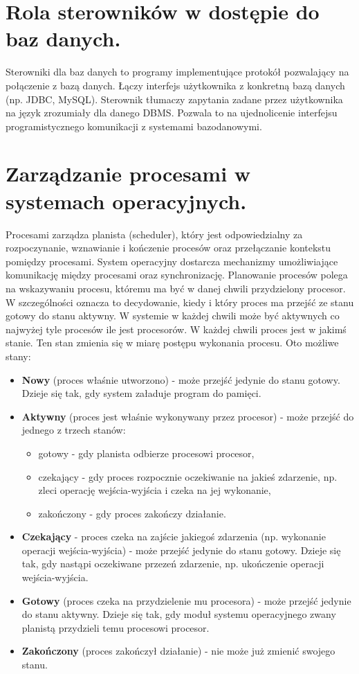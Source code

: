 \documentclass[12pt,a4paper]{article}
\begin{document}
	\section{Rola sterowników w dostępie do baz danych.}
	Sterowniki dla baz danych to programy implementujące protokół pozwalający na połączenie z bazą danych. Łączy interfejs użytkownika z konkretną bazą danych (np. JDBC, MySQL). Sterownik tłumaczy zapytania zadane przez użytkownika na język zrozumiały dla danego DBMS. Pozwala to na ujednolicenie interfejsu programistycznego komunikacji z systemami bazodanowymi.

	\section{Zarządzanie procesami w systemach operacyjnych.}
	Procesami zarządza planista (scheduler), który jest odpowiedzialny za rozpoczynanie, wznawianie i kończenie procesów oraz przełączanie kontekstu pomiędzy procesami. System operacyjny dostarcza mechanizmy umożliwiające komunikację między procesami oraz synchronizację. Planowanie procesów polega na wskazywaniu procesu, któremu ma być w danej chwili przydzielony procesor. W szczególności oznacza to decydowanie, kiedy i który proces ma przejść ze stanu gotowy do stanu aktywny. W systemie w każdej chwili może być aktywnych co najwyżej tyle procesów ile jest procesorów. W każdej chwili proces jest w jakimś stanie. Ten stan zmienia się w miarę postępu wykonania procesu. Oto możliwe stany:
	
	\begin{itemize}
		\item \textbf{Nowy} (proces właśnie utworzono) - może przejść jedynie do stanu gotowy. Dzieje się tak, gdy system załaduje program do pamięci.
		\item \textbf{Aktywny} (proces jest właśnie wykonywany przez procesor) - może przejść do jednego z trzech stanów:
		\begin{itemize}
			\item gotowy - gdy planista odbierze procesowi procesor,
			\item czekający - gdy proces rozpocznie oczekiwanie na jakieś zdarzenie, np. zleci operację wejścia-wyjścia i czeka na jej wykonanie,
			\item zakończony - gdy proces zakończy działanie.
		\end{itemize}
		\item \textbf{Czekający} - proces czeka na zajście jakiegoś zdarzenia (np. wykonanie operacji wejścia-wyjścia) -  może przejść jedynie do stanu gotowy. Dzieje się tak, gdy nastąpi oczekiwane przezeń zdarzenie, np. ukończenie operacji wejścia-wyjścia.
		\item \textbf{Gotowy} (proces czeka na przydzielenie mu procesora) - może przejść jedynie do stanu aktywny. Dzieje się tak, gdy moduł systemu operacyjnego zwany planistą przydzieli temu procesowi procesor.
		\item \textbf{Zakończony} (proces zakończył działanie) - nie może już zmienić swojego stanu.
	\end{itemize}
\end{document}
